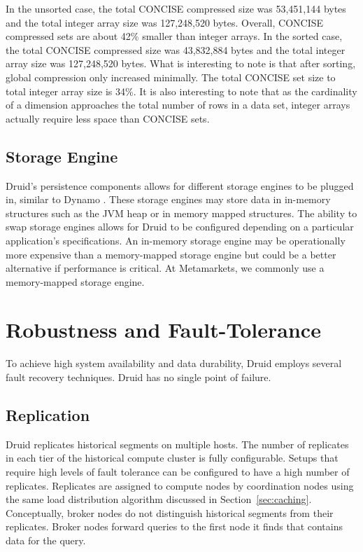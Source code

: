 \documentclass{vldb}
\begin{document}
In the unsorted case, the total CONCISE compressed size was 53,451,144
bytes and the total integer array size was 127,248,520 bytes. Overall,
CONCISE compressed sets are about 42\% smaller than integer arrays.
In the sorted case, the total CONCISE compressed size was 43,832,884
bytes and the total integer array size was 127,248,520 bytes.  What is
interesting to note is that after sorting, global compression only
increased minimally. The total CONCISE set size to total integer array
size is 34\%. It is also interesting to note that as the cardinality
of a dimension approaches the total number of rows in a data set,
integer arrays actually require less space than CONCISE sets.

\subsection{Storage Engine}
Druid’s persistence components allows for different storage engines to
be plugged in, similar to Dynamo \cite{decandia2007dynamo}. These storage engines may store
data in in-memory structures such as the JVM heap or in memory mapped
structures. The ability to swap storage engines allows for Druid to be
configured depending on a particular application’s specifications. An
in-memory storage engine may be operationally more expensive than a
memory-mapped storage engine but could be a better alternative if
performance is critical. At Metamarkets, we commonly use a
memory-mapped storage engine.

\section{Robustness and Fault-Tolerance}
\label{sec:robustness}
To achieve high system availability and data durability, Druid employs
several fault recovery techniques. Druid has no single point of
failure.

\subsection{Replication}
Druid replicates historical segments on multiple hosts. The number of
replicates in each tier of the historical compute cluster is fully
configurable. Setups that require high levels of fault tolerance can
be configured to have a high number of replicates. Replicates are
assigned to compute nodes by coordination nodes using the same load
distribution algorithm discussed in Section~\ref{sec:caching}. Conceptually,
broker nodes do not distinguish historical segments from their
replicates. Broker nodes forward queries to the first node it finds
that contains data for the query.
\end{document}
